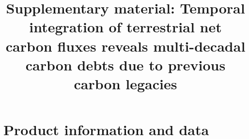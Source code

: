 \documentclass[10pt]{article}
\title{Supplementary material: Temporal integration of terrestrial net carbon fluxes reveals multi-decadal carbon debts due to previous carbon legacies}
\begin{document}
\renewcommand{\thesection}{S\arabic{section}}
\renewcommand{\thefigure}{S\arabic{figure}}
\renewcommand{\thetable}{S\arabic{table}}


\maketitle
 

\section{Product information and data}
\end{document}
